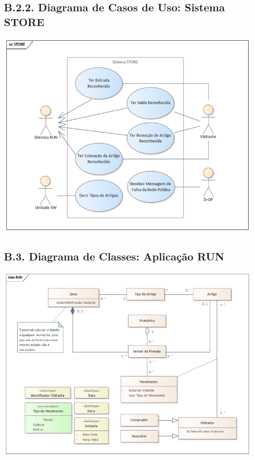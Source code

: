 \documentclass[12pt,a4paper]{article}
\begin{document}
\begin{landscape}
	\section*{B.2.2. Diagrama de Casos de Uso: Sistema STORE}
	\includegraphics[width=1.19\textwidth]{../UC_STORE.png}
\end{landscape}

\begin{landscape}
	\section*{B.3. Diagrama de Classes: Aplicação RUN}
	\includegraphics[width=1.26\textwidth]{../Class_RUN.png}
\end{landscape}
\end{document}
